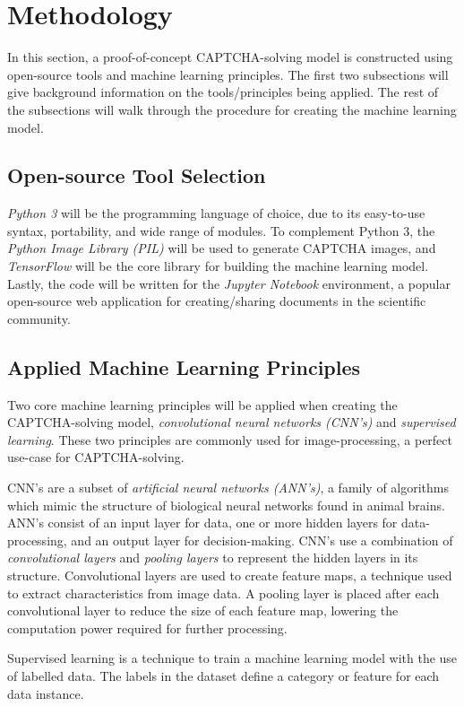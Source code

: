 \documentclass[11pt,conference]{IEEEtran}
\begin{document}
\section{Methodology}

In this section, a proof-of-concept CAPTCHA-solving model is constructed using
open-source tools and machine learning principles. The first two subsections
will give background information on the tools/principles being applied. The
rest of the subsections will walk through the procedure for creating the machine
learning model.

\subsection{Open-source Tool Selection}
\emph{Python 3} will be the programming language of choice, due to its
easy-to-use syntax, portability, and wide range of modules. To complement
Python 3, the \emph{Python Image Library (PIL)} will be used to generate
CAPTCHA images, and \emph{TensorFlow} will be the core library for building the
machine learning model. Lastly, the code will be written for the \emph{Jupyter
Notebook} environment, a popular open-source web application for creating/sharing
documents in the scientific community.

\subsection{Applied Machine Learning Principles}
Two core machine learning principles will be applied when creating the
CAPTCHA-solving model, \emph{convolutional neural networks (CNN's)} and
\emph{supervised learning}. These two principles are commonly used for
image-processing, a perfect use-case for CAPTCHA-solving.

CNN's are a subset of \emph{artificial neural networks (ANN's)}, a family of algorithms
which mimic the structure of biological neural networks found in animal brains.
ANN's consist of an input layer for data, one or more hidden layers for
data-processing, and an output layer for decision-making. CNN's use
a combination of \emph{convolutional layers} and \emph{pooling layers} to
represent the hidden layers in its structure. Convolutional layers are used to
create feature maps, a technique used to extract characteristics from image
data. A pooling layer is placed after each convolutional layer to reduce the
size of each feature map, lowering the computation power required for
further processing.

Supervised learning is a technique to train a machine learning model with
the use of labelled data. The labels in the dataset define a category or
feature for each data instance.
\end{document}
